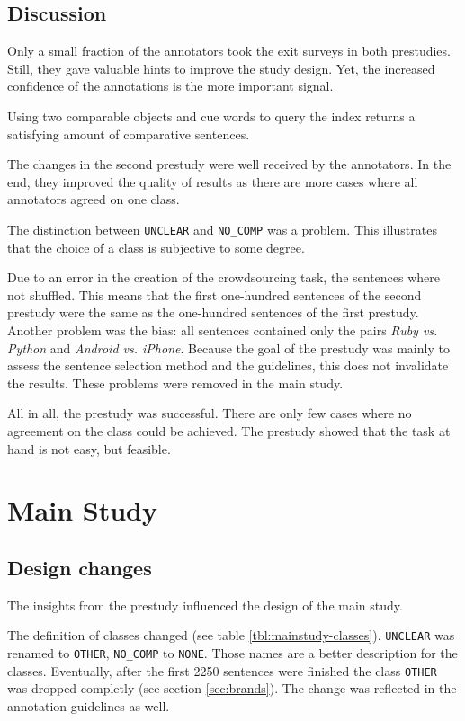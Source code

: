 \subsection{Discussion}
Only a small fraction of the annotators took the exit surveys in both prestudies. Still, they gave valuable hints to improve the study design. Yet, the increased confidence of the annotations is the more important signal.

Using two comparable objects and cue words to query the index returns a satisfying amount of comparative sentences.

The changes in the second prestudy were well received by the annotators. In the end, they improved the quality of results as there are more cases where all annotators agreed on one class.


The distinction between \texttt{UNCLEAR} and \texttt{NO\_COMP} was a problem. This illustrates that the choice of a class is subjective to some degree. 

Due to an error in the creation of the crowdsourcing task, the sentences where not shuffled. This means that the first one-hundred sentences of the second prestudy were the same as the one-hundred sentences of the first prestudy. Another problem was the bias: all sentences contained only the pairs \emph{Ruby vs. Python} and \emph{Android vs. iPhone}. Because the goal of the prestudy was mainly to assess the sentence selection method and the guidelines, this does not invalidate the results. These problems were removed in the main study.

All in all, the prestudy was successful. There are only few cases where no agreement on the class could be achieved. The prestudy showed that the task at hand is not easy, but feasible.

\newpage
\section{Main Study}
\label{sec:mainstudy}
\subsection{Design changes}
\label{sec:designchanges}
The insights from the prestudy influenced the design of the main study.

The definition of classes changed (see table \ref{tbl:mainstudy-classes}). \texttt{UNCLEAR} was renamed to \texttt{OTHER}, \texttt{NO\_COMP} to \texttt{NONE}. Those names are a better description for the classes. Eventually, after the first 2250 sentences were finished the class \texttt{OTHER} was dropped completly (see section \ref{sec:brands}). The change was reflected in the annotation guidelines as well. 

